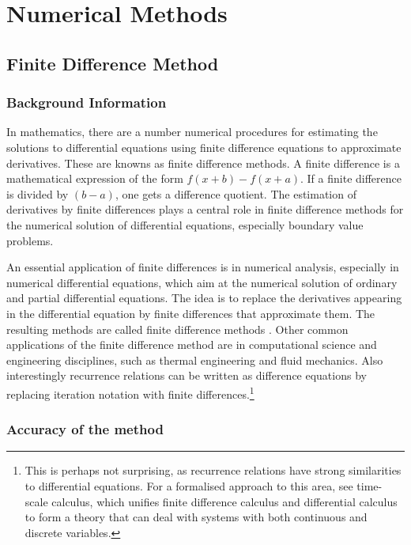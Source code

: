 \documentclass[aps,twocolumn,pre,nofootinbib,10pt]{revtex4-1}
\begin{document}
\section{Numerical Methods \label{sec:met}}

 
\subsection{Finite Difference Method}

\subsubsection{Background Information}

\par\hspace{4mm} In mathematics, there are a number numerical procedures for estimating the solutions to differential equations using finite difference equations to approximate derivatives. These are knowns as finite difference methods. A finite difference is a mathematical expression of the form \(f(x + b) - f(x + a)\). If a finite difference is divided by \((b - a)\), one gets a difference quotient. The estimation of derivatives by finite differences plays a central role in finite difference methods for the numerical solution of differential equations, especially boundary value problems.
\vspace{5mm} \par \indent An essential application of finite differences is in numerical analysis, especially in numerical differential equations, which aim at the numerical solution of ordinary and partial differential equations. The idea is to replace the derivatives appearing in the differential equation by finite differences that approximate them. The resulting methods are called finite difference methods \cite{compmethods}. Other common applications of the finite difference method are in computational science and engineering disciplines, such as thermal engineering and fluid mechanics. Also interestingly recurrence relations can be written as difference equations by replacing iteration notation with finite differences.\footnote{This is perhaps not surprising, as recurrence relations have strong similarities to differential equations. For a formalised approach to this area, see time-scale calculus, which unifies finite difference calculus and differential calculus to form a theory that can deal with 
systems with both 
continuous and discrete variables.}

\subsubsection{Accuracy of the method}
\end{document}
